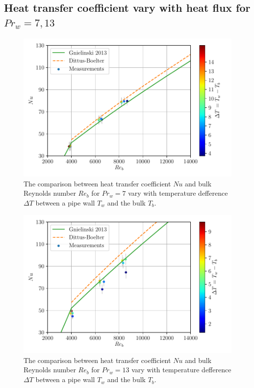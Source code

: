 \documentclass[12pt,oneside]{jbook}
\begin{document}
\clearpage
\subsection{Heat transfer coefficient vary with heat flux for $Pr_{w}=7, 13$}
\begin{figure}[ht]
	\vspace{0zh}
	\begin{center}
		\includegraphics[width=1\linewidth]{fig/pr7heatflux_renudt.pdf}
		\vspace{-3zh}
		\caption{The comparison between heat transfer coefficient $Nu$ and bulk Reynolds number $Re_{b}$ for $Pr_{w} = 7$ vary with temperature defference $\Delta T$ between a pipe wall $T_{w}$ and the bulk $T_{b}$.}
		\label{pr7_renu_heatflux}
	\end{center}
	\vspace{0zh}
\end{figure}

\begin{figure}[ht]
	\vspace{0zh}
	\begin{center}
		\includegraphics[width=1\linewidth]{fig/pr13heatflux_renudt.pdf}
		\vspace{-3zh}
		\caption{The comparison between heat transfer coefficient $Nu$ and bulk Reynolds number $Re_{b}$ for $Pr_{w} = 13$ vary with temperature defference $\Delta T$ between a pipe wall $T_{w}$ and the bulk $T_{b}$.}
		\label{pr13_renu_heatflux}
	\end{center}
	\vspace{0zh}
\end{figure}
\end{document}
